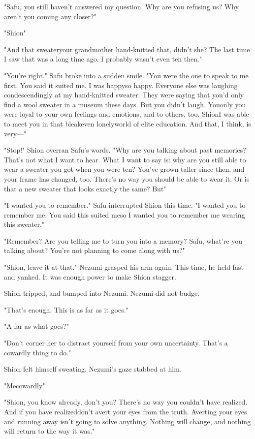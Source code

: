 "Safu, you still haven't answered my question. Why are you refusing us?
Why aren't you coming any closer?"

"Shion\el "

"And that sweater\el your grandmother hand-knitted that, didn't she? The
last time I saw that was a long time ago. I probably wasn't even ten
then."

"You're right." Safu broke into a sudden smile. "You were the one to
speak to me first. You said it suited me. I was happy\el so happy.
Everyone else was laughing condescendingly at my hand-knitted sweater.
They were saying that you'd only find a wool sweater in a museum these
days. But you didn't laugh. You\el only you were loyal to your own
feelings and emotions, and to others, too. Shion\el I was able to meet
you in that bleak\el even lonely\el world of elite education. And that,
I think, is very---"

"Stop!" Shion overran Safu's words. "Why are you talking about past
memories? That's not what I want to hear. What I want to say is: why are
you still able to wear a sweater you got when you were ten? You've grown
taller since then, and your frame has changed, too. There's no way you
should be able to wear it. Or is that a new sweater that looks exactly
the same? But\el "

"I wanted you to remember." Safu interrupted Shion this time. "I wanted
you to remember me. You said this suited me\el so I wanted you to
remember me wearing this sweater."

"Remember? Are you telling me to turn you into a memory? Safu, what're
you talking about? You're not planning to come along with us?"

"Shion, leave it at that." Nezumi grasped his arm again. This time, he
held fast and yanked. It was enough power to make Shion stagger.

Shion tripped, and bumped into Nezumi. Nezumi did not budge.

"That's enough. This is as far as it goes."

"A far as what goes?"

"Don't corner her to distract yourself from your own uncertainty. That's
a cowardly thing to do."

Shion felt himself sweating. Nezumi's gaze stabbed at him.

"Me\el cowardly\el "

"Shion, you know already, don't you? There's no way you couldn't have
realized. And if you have realized\el don't avert your eyes from the
truth. Averting your eyes and running away isn't going to solve
anything. Nothing will change, and nothing will return to the way it
was."

